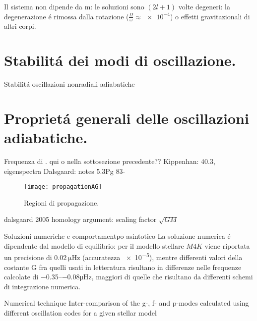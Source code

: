 \documentclass[oneside,12pt,fleqn]{memoir}
\begin{document}
{Il sistema non dipende da m: le soluzioni sono $(2l+1)$ volte degeneri: la degenerazione \'e rimossa dalla rotazione ($\frac{\Omega}{\omega}\approx\num{e-4}$) o effetti gravitazionali di altri corpi.


\section{Stabilit\'a dei modi di oscillazione.}

\begin{todo}{Stabilit\'a oscillazioni nonradiali adiabatiche}

\end{todo}

\section{Propriet\'a generali delle oscillazioni adiabatiche.}

\begin{todo}{Frequenza di \bv{}.}
qui o nella sottosezione precedente??
Kippenhan: 40.3, eigenspectra
Dalsgaard: notes 5.3Pg 83-
\end{todo}

\begin{figure}[!ht]
\centering
\texttt{[image: propagationAG]}
\caption{Regioni di propagazione.}
\end{figure}


\begin{todo}{dalsgaard 2005}
homology argument: scaling factor $\sqrt{GM}$
\end{todo}


\begin{todo}{Soluzioni numeriche e comportamentpo asintotico}
La soluzione numerica \'e dipendente dal modello di equilibrio: per il modello stellare $M4K$ viene riportata un precisione di $\SI{0.02}{\micro\hertz}$ (accuratezza \num{e-5}), mentre differenti valori della costante G fra quelli usati in letteratura risultano in differenze nelle frequenze calcolate di \numrange{-0.35}{-0.08}\si{\micro\hertz}, maggiori di quelle che risultano da differenti schemi di integrazione numerica.
\end{todo}

\begin{todo}{Numerical technique}
Inter-comparison of the g-, f- and p-modes calculated using different oscillation codes for a given stellar model

\end{todo}

}
\end{document}
